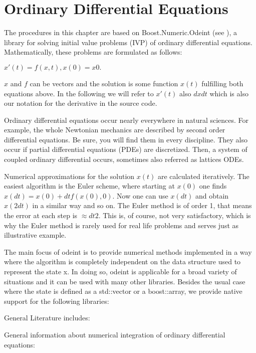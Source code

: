 
\chapter{Ordinary Differential Equations}
\label{OrdinaryDifferentialEquations} 

The procedures in this chapter are based on Boost.Numeric.Odeint (see \cite{boost_odeint}), a library for solving initial value problems (IVP) of ordinary differential equations. Mathematically, these problems are formulated as follows: 

$x'(t) = f(x,t), x(0) = x0. $

$x$ and $f$ can be vectors and the solution is some function $x(t)$ fulfilling both equations above. In the following we will refer to $x'(t)$ also $dxdt$ which is also our notation for the derivative in the source code. 

Ordinary differential equations occur nearly everywhere in natural sciences. For example, the whole Newtonian mechanics are described by second order differential equations. Be sure, you will find them in every discipline. They also occur if partial differential equations (PDEs) are discretized. Then, a system of coupled ordinary differential occurs, sometimes also referred as lattices ODEs. 

Numerical approximations for the solution $x(t)$ are calculated iteratively. The easiest algorithm is the Euler scheme, where starting at $x(0)$ one finds $x(dt) = x(0) + dt f(x(0),0)$. Now one can use $x(dt)$ and obtain $x(2dt)$ in a similar way and so on. The Euler method is of order 1, that means the error at each step is $\approx dt2$. This is, of course, not very satisfactory, which is why the Euler method is rarely used for real life problems and serves just as illustrative example. 

The main focus of odeint is to provide numerical methods implemented in a way where the algorithm is completely independent on the data structure used to represent the state x. In doing so, odeint is applicable for a broad variety of situations and it can be used with many other libraries. Besides the usual case where the state is defined as a std::vector or a boost::array, we provide native support for the following libraries: 

General Literature includes:

General information about numerical integration of ordinary differential equations: 

\cite{NumericalRecipes_2007}

